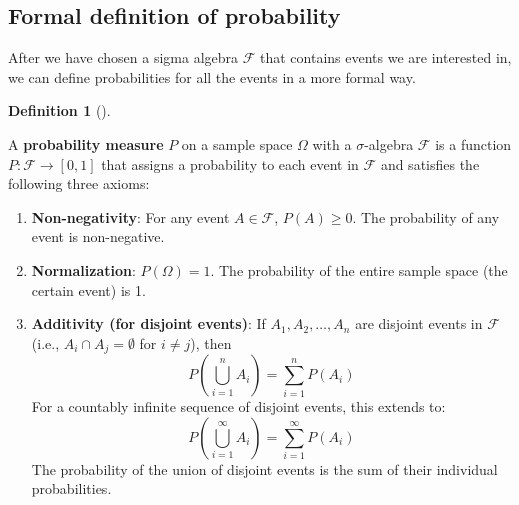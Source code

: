 \documentclass[
  letterpaper,
  DIV=11,
  numbers=noendperiod]{scrreport}
\theoremstyle{definition}
\theoremstyle{plain}
\theoremstyle{plain}
\theoremstyle{definition}
\newtheorem{definition}{Definition}[chapter]
\theoremstyle{remark}
\begin{document}
\subsection{Formal definition of
probability}\label{formal-definition-of-probability}

After we have chosen a sigma algebra \(\mathcal F\) that contains events
we are interested in, we can define probabilities for all the events in
a more formal way.

\begin{tcolorbox}[enhanced jigsaw, opacitybacktitle=0.6, bottomtitle=1mm, opacityback=0, toprule=.15mm, colbacktitle=quarto-callout-note-color!10!white, colback=white, left=2mm, title={Probability Measure (Kolmogorov's Axioms)}, breakable, rightrule=.15mm, leftrule=.75mm, titlerule=0mm, colframe=quarto-callout-note-color-frame, arc=.35mm, coltitle=black, toptitle=1mm, bottomrule=.15mm]

\begin{definition}[]\protect\hypertarget{def-probability-measure}{}\label{def-probability-measure}

A \textbf{probability measure} \(P\) on a sample space \(\Omega\) with a
\(\sigma\)-algebra \(\mathcal{F}\) is a function
\(P: \mathcal{F} \to [0, 1]\) that assigns a probability to each event
in \(\mathcal{F}\) and satisfies the following three axioms:

\begin{enumerate}
\def\labelenumi{\arabic{enumi}.}
\item
  \textbf{Non-negativity}: For any event \(A \in \mathcal{F}\),
  \(P(A) \ge 0\). The probability of any event is non-negative.
\item
  \textbf{Normalization}: \(P(\Omega) = 1\). The probability of the
  entire sample space (the certain event) is 1.
\item
  \textbf{Additivity (for disjoint events)}: If \(A_1, A_2, \dots, A_n\)
  are disjoint events in \(\mathcal{F}\) (i.e.,
  \(A_i \cap A_j = \emptyset\) for \(i \ne j\)), then
  \[ P\left(\bigcup_{i=1}^n A_i\right) = \sum_{i=1}^n P(A_i) \] For a
  countably infinite sequence of disjoint events, this extends to:
  \[ P\left(\bigcup_{i=1}^\infty A_i\right) = \sum_{i=1}^\infty P(A_i) \]
  The probability of the union of disjoint events is the sum of their
  individual probabilities.
\end{enumerate}

\end{definition}

\end{tcolorbox}
\end{document}
